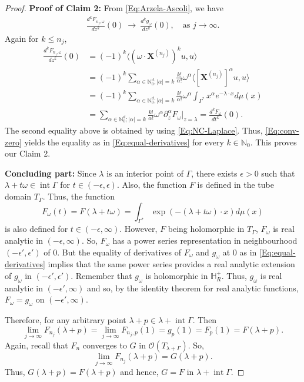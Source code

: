 \documentclass[11pt,reqno]{amsart}
\theoremstyle{plain}
\theoremstyle{definition}
\numberwithin{equation}{section}
\begin{document}
\begin{proof}
\noindent \textbf{Proof of Claim 2:} From \eqref{Eq:Arzela-Ascoli}, we have
\begin{align}\label{Eq:conv-zero}
    \frac{d^k F_{n_j, \omega}}{dz^k}(0) \  \rightarrow \ \frac{d^k g_\omega} {dz^k}(0), \quad \text{as } j\to \infty.
\end{align}
Again for $k \leq n_j$,
\begin{align*}
    \frac{d^k F_{n_j, \omega}}{dz^k}(0) &= (-1)^k \langle (\omega \cdot \boldsymbol{X}^{(n_j)} )^k u, u \rangle  \\
    &= (-1)^k \sum_{\alpha \in \mathbb{N}_0^d; |\alpha|=k} \frac{k!}{\alpha!}\omega^\alpha \langle  [\boldsymbol{X}^{(n_j)} ]^\alpha u, u \rangle \\
    &=(-1)^k \sum_{\alpha \in \mathbb{N}_0^d; |\alpha|=k} \frac{k!}{\alpha!}\omega^\alpha \int_{\Gamma^*} x^\alpha e^{-\lambda \cdot x} d\mu(x) \\
    &= \sum_{\alpha \in \mathbb{N}_0^d; |\alpha|=k} \frac{k!}{\alpha!}\omega^\alpha \partial^\alpha_z F_\omega|_{z=\lambda}
    = \frac{d^k F_\omega}{dt^k}(0).
\end{align*}
The second equality above is obtained by using \eqref{Eq:NC-Laplace}.
Thus, \eqref{Eq:conv-zero} yields the equality as in \eqref{Eq:equal-derivatives} for every $k\in \mathbb{N}_0$. This proves our Claim 2.


\vspace{2mm}
\noindent \textbf{Concluding part:} Since $\lambda$ is an interior point of $\Gamma$, there exists $\epsilon > 0$ such that $\lambda + t\omega \in \operatorname{int} \Gamma$ for $t\in (-\epsilon, \epsilon)$. Also, the function $F$ is defined in the tube domain $T_\Gamma$. Thus, the function
$$
F_\omega(t) = F(\lambda + t\omega) = \int_{\Gamma^*} \exp(-(\lambda+ t\omega)\cdot x) d\mu(x)
$$
is also defined for $t\in (-\epsilon, \infty)$. However, $F$ being holomorphic in $T_\Gamma$, $F_\omega$ is real analytic in $(-\epsilon, \infty)$. So, $F_\omega$ has a power series representation in neighbourhood $(-\epsilon', \epsilon')$ of $0$. But the equality of derivatives of $F_\omega$ and $g_\omega$ at $0$ as in \eqref{Eq:equal-derivatives} implies that the same power series provides a real analytic extension of $g_\omega$ in $(-\epsilon', \epsilon')$. Remember that $g_\omega$ is holomorphic in $\mathbb{H}^+_R$. Thus, $g_\omega$ is real analytic in $(-\epsilon', \infty)$ and so, by the identity theorem for real analytic functions, $F_\omega = g_\omega$ on $(-\epsilon', \infty)$.

Therefore, for any arbitrary point $\lambda + p \in \lambda + \operatorname{int} \Gamma$. Then 
$$
\lim_{j\to \infty} F_{n_j}(\lambda + p) = \lim_{j\to \infty} F_{n_j, p} (1) = g_p(1) = F_p(1)=F(\lambda +p).
$$
Again, recall that $F_n$ converges to $G$ in $\mathcal{O}(T_{\lambda + \Gamma})$. So, 
$$
\lim_{j\to \infty} F_{n_j}(\lambda + p) = G(\lambda + p).
$$
Thus, $G(\lambda + p)=F(\lambda + p)$ and hence, $G=F$ in $\lambda + \operatorname{int} \Gamma$.  


\end{proof}
\end{document}
